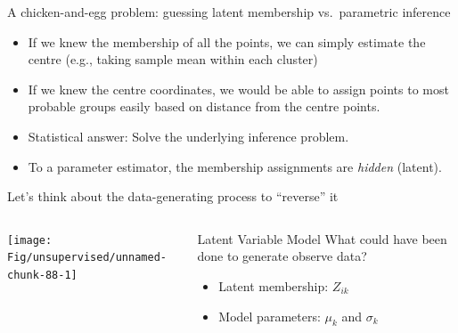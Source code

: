 \documentclass[
  ignorenonframetext,
  aspectratio=169]{beamer}
\begin{document}
\begin{frame}{A chicken-and-egg problem: guessing latent membership
vs.~parametric inference}
\protect\hypertarget{a-chicken-and-egg-problem-guessing-latent-membership-vs.-parametric-inference}{}
\begin{itemize}
\item
  If we knew the membership of all the points, we can simply estimate
  the centre (e.g., taking sample mean within each cluster)
\item
  If we knew the centre coordinates, we would be able to assign points
  to most probable groups easily based on distance from the centre
  points.
\item
  Statistical answer: Solve the underlying inference problem.
\item
  To a parameter estimator, the membership assignments are \emph{hidden}
  (latent).
\end{itemize}

\scriptsize

\normalsize

\scriptsize

\normalsize
\end{frame}

\begin{frame}{Let's think about the data-generating process to
``reverse'' it}
\protect\hypertarget{lets-think-about-the-data-generating-process-to-reverse-it}{}
\begin{columns}[T]
\begin{column}{.5\textwidth}
\scriptsize

\begin{center}\texttt{[image: Fig/unsupervised/unnamed-chunk-88-1]} \end{center}

\normalsize
\end{column}

\begin{column}{.45\textwidth}
\begin{block}{Latent Variable Model}
\protect\hypertarget{latent-variable-model}{}
What could have been done to generate observe data?

\begin{itemize}
\item
  Latent membership: \(Z_{ik}\)
\item
  Model parameters: \(\mu_{k}\) and \(\sigma_{k}\)
\end{itemize}
\end{block}
\end{column}
\end{columns}
\end{frame}
\end{document}
